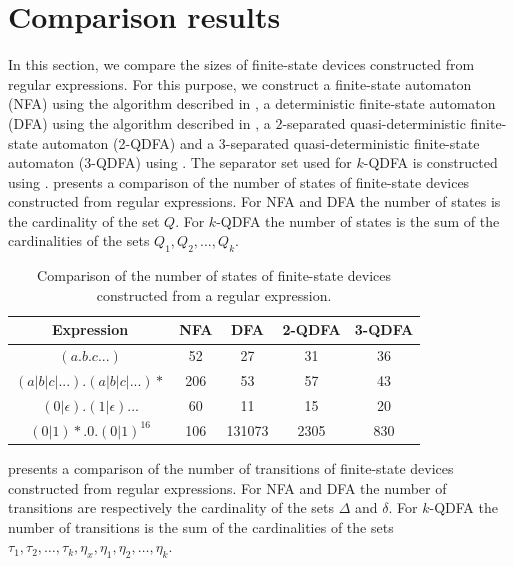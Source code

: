 \section{Comparison results}

In this section, we compare the sizes of finite-state devices constructed from
regular expressions. For this purpose, we construct a finite-state automaton (NFA)
using the algorithm described in , a deterministic finite-state
automaton (DFA) using the algorithm described in , a
$2$-separated quasi-deterministic finite-state automaton (2-QDFA) and a
$3$-separated quasi-deterministic finite-state automaton (3-QDFA) using
. The separator set used for  $k$-QDFA is constructed
using .
\bigbreak
{} presents a comparison of the number of states of
finite-state devices constructed from regular expressions. For NFA and DFA the number
of states is the cardinality of the set $Q$. For $k$-QDFA the number of states is the
sum of the cardinalities of the sets $Q_1, Q_2, \ldots, Q_k$.

\begin{table}[h]
  \centering
  \begin{tabular}{||c c c c c||} 
    \hline
    Expression & NFA & DFA & 2-QDFA & 3-QDFA \\ [0.5ex] 
    \hline
    $(a.b.c...)$ & 52 & 27 & 31 & 36 \\
    \hline
    $(a|b|c|...).(a|b|c|...)*$ & 206 & 53 & 57 & 43 \\
    \hline
    $(0|\epsilon).(1|\epsilon)...$ & 60 & 11 & 15 & 20 \\
    \hline
    $(0|1)*.0.(0|1)^{16}$ & 106 & 131073 & 2305 & 830 \\
    \hline
  \end{tabular}
  \caption{Comparison of the number of states of finite-state devices constructed
    from a regular expression.}
  \label{tbl:state_comparison}
\end{table}

 presents a comparison of the number of transitions
of finite-state devices constructed from regular expressions. For NFA and DFA the
number of transitions are respectively the cardinality of the sets $\Delta$ and
$\delta$. For $k$-QDFA the number of transitions is the sum of the cardinalities of
the sets $\tau_1, \tau_2, \ldots, \tau_k, \eta_x, \eta_1, \eta_2, \ldots, \eta_k$.

